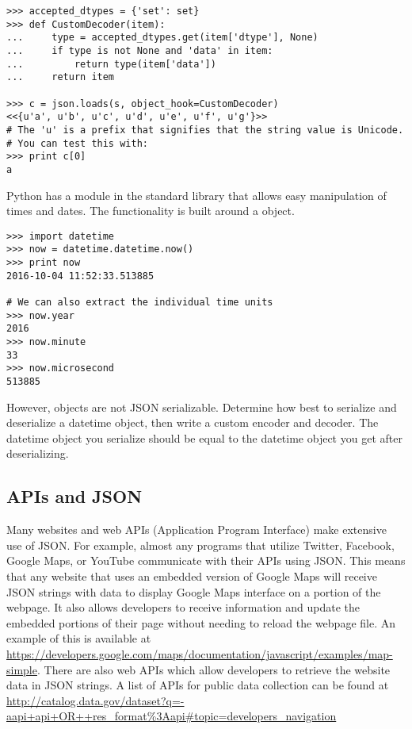 \begin{lstlisting}
>>> accepted_dtypes = {'set': set}
>>> def CustomDecoder(item):
...     type = accepted_dtypes.get(item['dtype'], None)
...     if type is not None and 'data' in item:
...         return type(item['data'])
...     return item

>>> c = json.loads(s, object_hook=CustomDecoder)
<<{u'a', u'b', u'c', u'd', u'e', u'f', u'g'}>>
# The 'u' is a prefix that signifies that the string value is Unicode.
# You can test this with:
>>> print c[0]
a
\end{lstlisting}

\begin{problem} %
Python has a module in the standard library that allows easy manipulation of times and dates. The functionality is built around a  object.

\begin{lstlisting}
>>> import datetime
>>> now = datetime.datetime.now()
>>> print now
2016-10-04 11:52:33.513885

# We can also extract the individual time units
>>> now.year
2016
>>> now.minute
33
>>> now.microsecond
513885
\end{lstlisting}

However,  objects are not JSON serializable.
Determine how best to serialize and deserialize a datetime object, then write a custom encoder and decoder.
The datetime object you serialize should be equal to the datetime object you get after deserializing.
\label{prob:datetime_json}
\end{problem}

\subsection*{APIs and JSON}

Many websites and web APIs (Application Program Interface) make extensive use of JSON.
For example, almost any programs that utilize Twitter, Facebook, Google Maps, or YouTube communicate with their APIs using JSON.
This means that any website that uses an embedded version of Google Maps will receive JSON strings with data to display Google Maps interface on a portion of the webpage.
It also allows developers to receive information and update the embedded portions of their page without needing to reload the webpage file.
An example of this is available at \url{https://developers.google.com/maps/documentation/javascript/examples/map-simple}.
There are also web APIs which allow developers to retrieve the website data in JSON strings.
A list of APIs for public data collection can be found at \url{http://catalog.data.gov/dataset?q=-aapi+api+OR++res_format%3Aapi#topic=developers_navigation}

